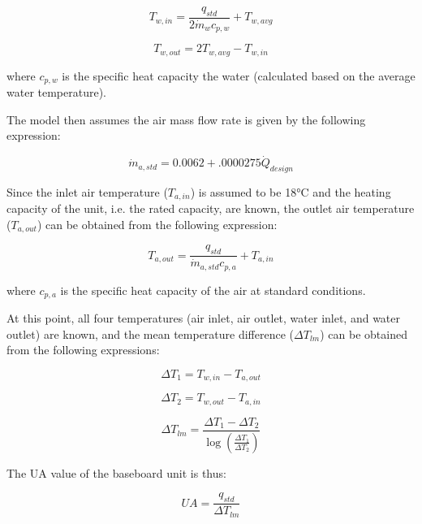 \begin{equation}
{T_{w,in}} = \frac{{{q_{std}}}}{{2\dot m{}_w{c_{p,w}}}} + {T_{w,avg}}
\end{equation}

\begin{equation}
{T_{w,out}} = 2{T_{w,avg}} - {T_{w,in}}
\end{equation}

where \({c_{p,w}}\) is the specific heat capacity the water (calculated based on the average water temperature).

The model then assumes the air mass flow rate is given by the following expression:

\begin{equation}
\dot{m}_{a,std} = 0.0062 + .0000275 \dot{Q}_{design}
\end{equation}

Since the inlet air temperature (\({T_{a,in}}\)) is assumed to be 18°C and the heating capacity of the unit, i.e. the rated capacity, are known, the outlet air temperature (\({T_{a,out}}\)) can be obtained from the following expression:

\begin{equation}
T_{a,out} = \frac{q_{std}}{\dot{m}_{a,std}c_{p,a}} + T_{a,in}
\end{equation}

where \({c_{p,a}}\) is the specific heat capacity of the air at standard conditions.

At this point, all four temperatures (air inlet, air outlet, water inlet, and water outlet) are known, and the mean temperature difference (\(\Delta {T_{lm}}\)) can be obtained from the following expressions:

\begin{equation}
\Delta {T_1} = {T_{w,in}} - {T_{a,out}}
\end{equation}

\begin{equation}
\Delta {T_2} = {T_{w,out}} - {T_{a,in}}
\end{equation}

\begin{equation}
\Delta {T_{lm}} = \frac{{\Delta {T_1} - \Delta {T_2}}}{{\log \left( {\frac{{\Delta {T_1}}}{{\Delta {T_2}}}} \right)}}
\end{equation}

The UA value of the baseboard unit is thus:

\begin{equation}
UA = \frac{{{q_{std}}}}{{\Delta {T_{lm}}}}
\end{equation}

